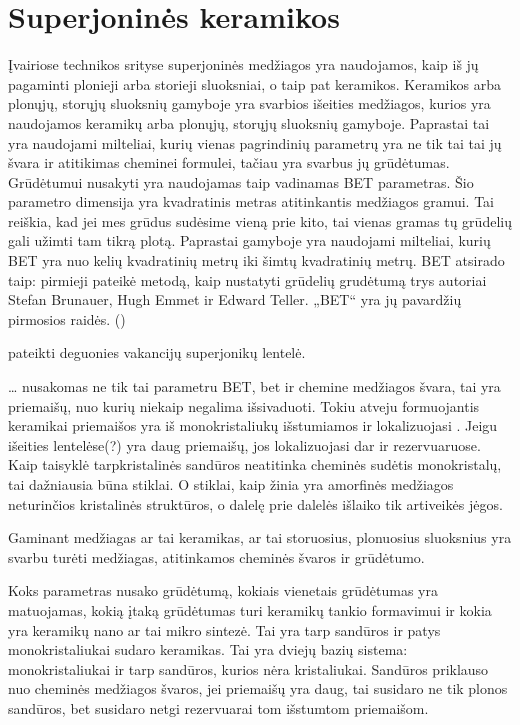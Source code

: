 \section{Superjoninės keramikos}

Įvairiose technikos srityse superjoninės medžiagos yra naudojamos,
kaip iš jų pagaminti plonieji arba storieji sluoksniai, o taip
pat keramikos. Keramikos arba plonųjų, storųjų sluoksnių gamyboje
yra svarbios išeities medžiagos, kurios yra naudojamos keramikų
arba plonųjų, storųjų sluoksnių gamyboje. Paprastai tai yra naudojami
milteliai, kurių vienas pagrindinių parametrų yra ne tik tai tai
jų švara ir atitikimas cheminei formulei, tačiau yra svarbus
jų grūdėtumas. Grūdėtumui nusakyti yra naudojamas taip vadinamas
BET parametras. Šio parametro dimensija yra kvadratinis metras
atitinkantis medžiagos gramui. Tai reiškia, kad jei mes grūdus
sudėsime vieną prie kito, tai vienas gramas tų grūdelių gali
užimti tam tikrą plotą. Paprastai gamyboje yra naudojami milteliai,
kurių BET yra nuo kelių kvadratinių metrų iki šimtų kvadratinių
metrų. BET atsirado taip: pirmieji pateikė metodą, kaip nustatyti
grūdelių grudėtumą trys autoriai Stefan Brunauer, Hugh Emmet ir
Edward Teller. „BET“ yra jų pavardžių pirmosios raidės. ()

 pateikti deguonies vakancijų superjonikų lentelė.


… nusakomas ne tik tai parametru BET, bet ir chemine medžiagos švara,
tai yra priemaišų, nuo kurių niekaip negalima išsivaduoti. Tokiu
atveju formuojantis keramikai priemaišos yra iš monokristaliukų 
išstumiamos ir lokalizuojasi . Jeigu išeities lentelėse(?)
yra daug priemaišų, jos lokalizuojasi dar ir rezervuaruose.
Kaip taisyklė tarpkristalinės sandūros neatitinka cheminės sudėtis
monokristalų, tai dažniausia būna stiklai. O stiklai, kaip
žinia yra amorfinės medžiagos neturinčios kristalinės struktūros,
o dalelę prie dalelės išlaiko tik artiveikės jėgos.

\begin{remember}
  \item Gaminant medžiagas ar tai keramikas, ar tai storuosius,
    plonuosius sluoksnius yra svarbu turėti  medžiagas,
    atitinkamos cheminės švaros ir grūdėtumo.
  \item Koks parametras nusako grūdėtumą, kokiais vienetais grūdėtumas
    yra matuojamas, kokią įtaką grūdėtumas turi keramikų tankio
    formavimui  ir kokia yra
    keramikų nano ar tai mikro sintezė. Tai yra tarp 
    sandūros ir patys monokristaliukai sudaro keramikas. Tai yra
    dviejų bazių sistema: monokristaliukai ir tarp 
    sandūros, kurios nėra kristaliukai. Sandūros priklauso nuo
    cheminės medžiagos švaros, jei priemaišų yra daug, tai susidaro
    ne tik plonos sandūros, bet susidaro netgi rezervuarai tom
    išstumtom priemaišom.
\end{remember}

